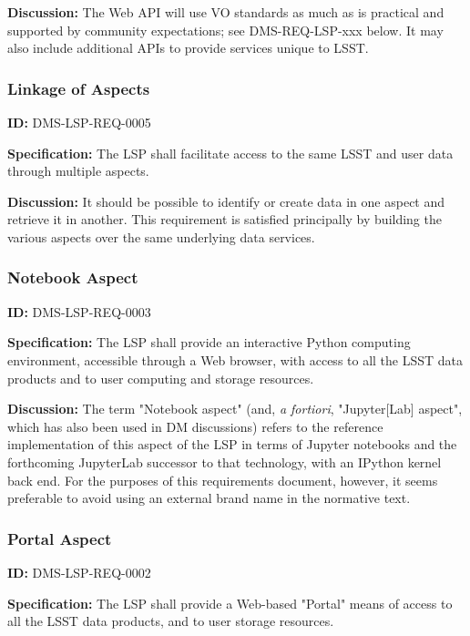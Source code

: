 \documentclass[SE,toc,lsstdraft]{lsstdoc}
\begin{document}
\textbf{Discussion:}
The Web API will use VO standards as much as is practical and supported by community expectations; see DMS-REQ-LSP-xxx below.  It may also include additional APIs to provide services unique to LSST.

\subsubsection{Linkage of Aspects}

\label{DMS-LSP-REQ-0005}
\textbf{ID:} DMS-LSP-REQ-0005

\textbf{Specification:}
The LSP shall facilitate access to the same LSST and user data through multiple aspects.

\textbf{Discussion:}
It should be possible to identify or create data in one aspect and retrieve it in another.  This requirement is satisfied principally by building the various aspects over the same underlying data services.

\subsubsection{Notebook Aspect}

\label{DMS-LSP-REQ-0003}
\textbf{ID:} DMS-LSP-REQ-0003

\textbf{Specification:}
The LSP shall provide an interactive Python computing environment, accessible through a Web browser, with access to all the LSST data products and to user computing and storage resources.

\textbf{Discussion:}
The term "Notebook aspect" (and, \textit{a fortiori}, "Jupyter[Lab] aspect", which has also been used in DM discussions) refers to the reference implementation of this aspect of the LSP in terms of Jupyter notebooks and the forthcoming JupyterLab successor to that technology, with an IPython kernel back end. For the purposes of this requirements document, however, it seems preferable to avoid using an external brand name in the normative text.

\subsubsection{Portal Aspect}

\label{DMS-LSP-REQ-0002}
\textbf{ID:} DMS-LSP-REQ-0002

\textbf{Specification:}
The LSP shall provide a Web-based "Portal" means of access to all the LSST data products, and to user storage resources.
\end{document}
